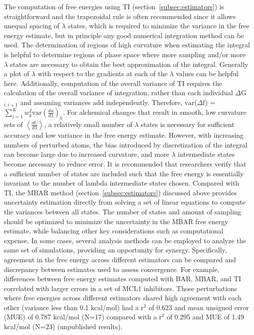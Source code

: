 \documentclass[9pt,bestpractices]{livecoms}
\newcommand{\expect}[1]{\left\langle{#1}\right\rangle}
\begin{document}
The computation of free energies using TI (section~\ref{subsec:estimators}) is straightforward and the trapezoidal rule is often recommended since it allows unequal spacing of $\lambda$ states, which is required to minimize the variance in the free energy estimate, but in principle any good numerical integration method can be used. 
The determination of regions of high curvature when estimating the integral is helpful to determine regions of phase space where more sampling and/or more $\lambda$ states are necessary to obtain the best approximation of the integral. Generally a plot of $\lambda$ with respect to the gradients at each of the $\lambda$ values can be helpful here. 
Additionally, computation of the overall variance of TI requires the calculation of the overall variance of integration, rather than each individual $\Delta$G$_{i,i+1}$ and assuming variances add independently. 
Therefore, $\mathrm{var}$($\Delta$f) = $\sum_{i=1}^{K}w_{k}^2 \mathrm{var}(\frac{du}{d\lambda})_{k}$.
%
For alchemical changes that result in smooth, low curvature sets of $\expect{\frac{dU}{d\lambda}}$, a relatively small number of $\lambda$ states is necessary for sufficient accuracy and low variance in the free energy estimate. 
However, with increasing numbers of perturbed atoms, the bias introduced by discretization of the integral can become large due to increased curvature, and more $\lambda$ intermediate states become necessary to reduce error.
It is recommended that researchers verify that a sufficient number of states are included such that the free energy is essentially invariant to the number of lambda intermediate states chosen.
%
Compared with TI, the MBAR method (section~\ref{subsec:estimators}) discussed above provides uncertainty estimation directly from solving a set of linear equations to compute the variances between all states. 
The number of states and amount of sampling should be optimized to minimize the uncertainty in the MBAR free energy estimate, while balancing other key considerations such as computational expense. 
%
In some cases, several analysis methods can be employed to analyze the same set of simulations, providing an opportunity for synergy. Specifically, agreement in the free energy across different estimators can be compared and discrepancy between estimates used to assess convergence.
For example, differences between free energy estimates computed with BAR, MBAR, and TI correlated with larger errors in a set of MCL1 inhibitors.
Those perturbations where free energies across different estimators shared high agreement with each other (variance less than 0.1 kcal/mol) had a r$^2$ of 0.623 and mean unsigned error (MUE) of 0.787 kcal/mol (N=17) compared with a r$^2$ of 0.295 and MUE of 1.49 kcal/mol (N=23) (unpublished results).
\end{document}
